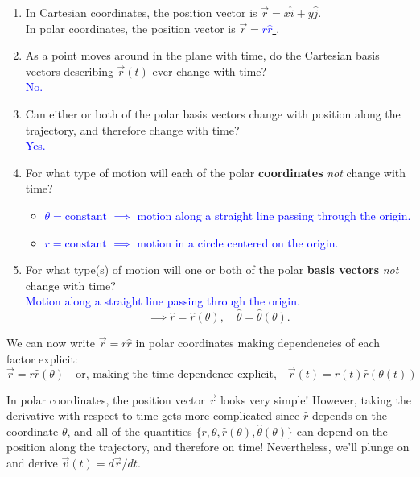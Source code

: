\documentclass[11pt, letterpaper, openany]{book}
\begin{document}
\begin{enumerate}[resume, label=(\alph*)]
    \item In Cartesian coordinates, the position vector is $\vec{r} = x\hat{i} + y\hat{j}$. \\
    In polar coordinates, the position vector is $\vec{r} = $\underline{\textcolor{blue}{\quad $r\hat{r}$ \quad}}.
    \item As a point moves around in the plane with time, do the Cartesian basis vectors describing $\vec{r}(t)$ ever change with time? \\
    \textcolor{blue}{No.}
    \item Can either or both of the polar basis vectors change with position along the trajectory, and therefore change with time? \\
    \textcolor{blue}{Yes.}
    \item For what type of motion will each of the polar \textbf{coordinates} \textit{not} change with time?
    \begin{itemize}
        \item \textcolor{blue}{$\theta = \text{constant}$ $\implies$ motion along a straight line passing through the origin.}
        \item \textcolor{blue}{$r = \text{constant}$ $\implies$ motion in a circle centered on the origin.}
    \end{itemize}
    \item For what type(s) of motion will one or both of the polar \textbf{basis vectors} \textit{not} change with time? \\
    \textcolor{blue}{Motion along a straight line passing through the origin.}
    \[ \implies \hat{r} = \hat{r}(\theta), \quad \hat{\theta} = \hat{\theta}(\theta). \]
\end{enumerate}

We can now write $\vec{r} = r\hat{r}$ in polar coordinates making dependencies of each factor explicit:
\[ \vec{r} = r\hat{r}(\theta) \quad \text{or, making the time dependence explicit,} \quad \vec{r}(t) = r(t)\hat{r}(\theta(t)) \]

In polar coordinates, the position vector $\vec{r}$ looks very simple! However, taking the derivative with respect to time gets more complicated since $\hat{r}$ depends on the coordinate $\theta$, and all of the quantities $\{r, \theta, \hat{r}(\theta), \hat{\theta}(\theta)\}$ can depend on the position along the trajectory, and therefore on time! Nevertheless, we'll plunge on and derive $\vec{v}(t) = d\vec{r}/dt$.
\end{document}
